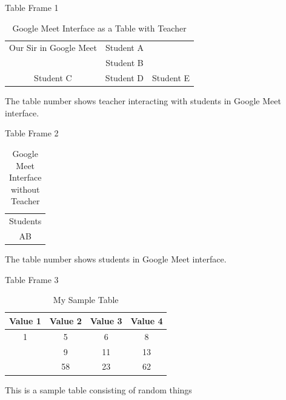 \documentclass{beamer}
\begin{document}
\begin{frame}{Table Frame 1}
    \begin{table}[h]
        \centering
        \begin{tabular}{c c c}
        \hline
           Our Sir in Google Meet  & Student A &   \pause \\
              & Student B &  \pause \\
              \hline
             Student C & Student D & Student E\\
             \hline
        \end{tabular}
        \caption{ Google Meet Interface as a Table with Teacher}
        \label{Table:}
    \end{table}
    The table number shows teacher interacting with students in
Google Meet interface.
\end{frame}
\begin{frame}{Table Frame 2}
    \begin{table}[h]
        \centering
        \begin{tabular}{c}
            \hline
            Students\\
            A\hspace{2em}B\\
            \hline
        \end{tabular}
        \caption{Google Meet Interface without Teacher}
        \label{tab:my_label}
    \end{table}
    The table number shows students in Google Meet interface.
\end{frame}
\begin{frame}{Table Frame 3}
    \begin{table}[h]
        \caption{My Sample Table}
        \label{tab:my_label}
        \centering
        \begin{tabular}{c|c|c|c}
            \textbf{Value 1} & \textbf{Value 2} & \textbf{Value 3} & \textbf{Value 4}  \\
            \hline
            1 & 5 & 6 & 8\\ \pause
            2 & 9 & 11 & 13\\ \pause
            3 & 58 & 23 & 62 \\
        \end{tabular} 
    \end{table}\pause
    This is a sample table consisting of random things
\end{frame}
\end{document}
